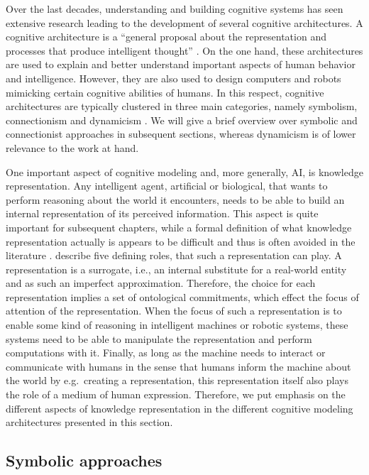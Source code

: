 Over the last decades, understanding and building cognitive systems has seen extensive research leading to the development of several cognitive architectures.
A cognitive architecture is a \enquote{general proposal about the representation and processes that produce intelligent thought} \parencite{Thagard2012}.
On the one hand, these architectures are used to explain and better understand important aspects of human behavior and intelligence.
However, they are also used to design computers and robots mimicking certain cognitive abilities of humans.
In this respect, cognitive architectures are typically clustered in three main categories, namely symbolism, connectionism and dynamicism \parencite{Eliasmith2013}.
We will give a brief overview over symbolic and connectionist approaches in subsequent sections, whereas dynamicism \parencite{Schoener2008} is of lower relevance to the work at hand.

One important aspect of cognitive modeling and, more generally, \ac{AI}, is knowledge representation.
Any intelligent agent, artificial or biological, that wants to perform reasoning about the world it encounters, needs to be able to build an internal representation of its perceived information.
This aspect is quite important for subsequent chapters, while a formal definition of what knowledge representation actually is appears to be difficult and thus is often avoided in the literature \parencite{Davis1993}.
\textcite{Davis1993} describe five defining roles, that such a representation can play.
A representation is a surrogate, i.e., an internal substitute for a real-world entity and as such an imperfect approximation.
Therefore, the choice for each representation implies a set of ontological commitments, which effect the focus of attention of the representation.  
When the focus of such a representation is to enable some kind of reasoning in intelligent machines or robotic systems, these systems need to be able to manipulate the representation and perform computations with it.
Finally, as long as the machine needs to interact or communicate with humans in the sense that humans inform the machine about the world by e.g.\ creating a representation, this representation itself also plays the role of a medium of human expression.
Therefore, we put emphasis on the different aspects of knowledge representation in the different cognitive modeling architectures presented in this section.

\subsection{Symbolic approaches}%
\label{subsec:symbolic_approaches}

